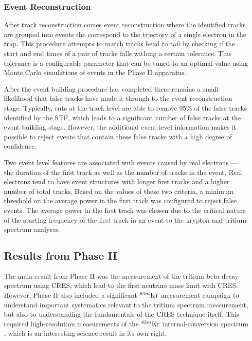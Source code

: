 \subsubsection*{Event Reconstruction}

After track reconstruction comes event reconstruction where the identified tracks are grouped into events the correspond to the trjectory of a single electron in the trap. This procedure attempts to match tracks head to tail by checking if the start and end times of a pair of tracks falls withing a certain tolerance. This tolerance is a configurable parameter that can be tuned to an optimal value using Monte Carlo simulations of events in the Phase II apparatus.

After the event building procedure has completed there remains a small likelihood that false tracks have made it through to the event reconstruction stage. Typically, cuts at the track level are able to remove 95\% of the false tracks identified by the STF, which leads to a significant number of false tracks at the event building stage. However, the additional event-level information makes it possible to reject events that contain these false tracks with a high degree of confidence. 

Two event level features are associated with events caused by real electrons --- the duration of the first track as well as the number of tracks in the event. Real electrons tend to have event structures with longer first tracks and a higher number of total tracks. Based on the values of these two criteria, a minimum threshold on the average power in the first track was configured to reject false events. The average power in the first track was chosen due to the critical nature of the starting frequency of the first track in an event to the krypton and tritium spectrum analyses.

\subsection{Results from Phase II}

The main result from Phase II was the measurement of the tritium beta-decay spectrum using CRES, which lead to the first neutrino mass limit with CRES. However, Phase II also included a significant $^{83m}\rm{Kr}$ measurement campaign to understand important systematics relevant to the tritium spectrum measurement, but also to understanding the fundamentals of the CRES technique itself. This required high-resolution measurements of the $^{83m}\rm{Kr}$ internal-conversion spectrum \cite{krypton83m}, which is an interesting science result in its own right.

